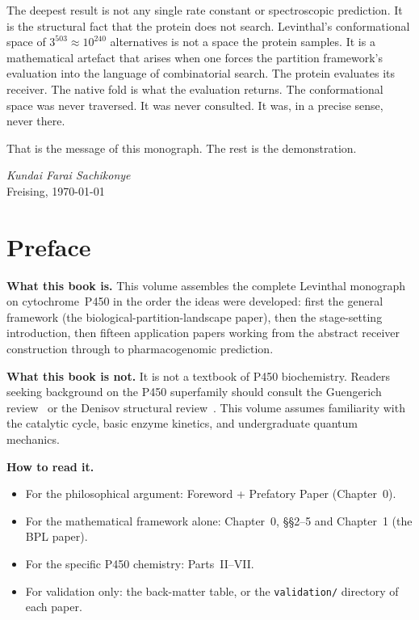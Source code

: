 \documentclass[11pt,a4paper,openany,twoside]{book}
\theoremstyle{definition}
\theoremstyle{remark}
\begin{document}
The deepest result is not any single rate constant or spectroscopic
prediction.  It is the structural fact that the protein does not search.
Levinthal's conformational space of $3^{503} \approx 10^{240}$ alternatives
is not a space the protein samples.  It is a mathematical artefact that arises
when one forces the partition framework's evaluation into the language of
combinatorial search.  The protein evaluates its receiver.  The native fold
is what the evaluation returns.  The conformational space was never traversed.
It was never consulted.  It was, in a precise sense, never there.

That is the message of this monograph.  The rest is the demonstration.

\vspace{2em}
\begin{flushright}
\textit{Kundai Farai Sachikonye}\\
Freising, \today
\end{flushright}

\cleardoublepage

\chapter*{Preface}

\noindent\textbf{What this book is.}
This volume assembles the complete Levinthal monograph on cytochrome~P450 in
the order the ideas were developed: first the general framework (the
biological-partition-landscape paper), then the stage-setting introduction,
then fifteen application papers working from the abstract receiver construction
through to pharmacogenomic prediction.

\noindent\textbf{What this book is not.}
It is not a textbook of P450 biochemistry.  Readers seeking background on the
P450 superfamily should consult the Guengerich review~\citep{guengerich2015}
or the Denisov structural review~\citep{denisov2005}.  This volume assumes
familiarity with the catalytic cycle, basic enzyme kinetics, and undergraduate
quantum mechanics.

\noindent\textbf{How to read it.}
\begin{itemize}[noitemsep]
  \item For the philosophical argument: Foreword + Prefatory Paper (Chapter~0).
  \item For the mathematical framework alone: Chapter~0, §§2--5 and
    Chapter~1 (the BPL paper).
  \item For the specific P450 chemistry: Parts~II--VII.
  \item For validation only: the back-matter table, or the
    \texttt{validation/} directory of each paper.
\end{itemize}
\end{document}
